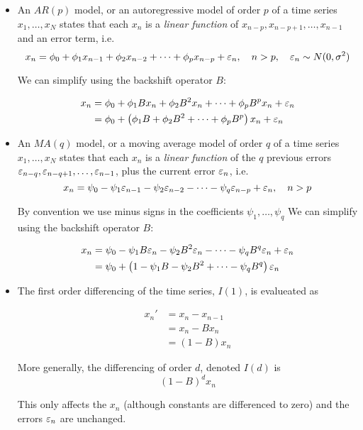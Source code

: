 \begin{itemize}
\item An $AR(p)$ model, or an autoregressive model of order $p$ of a time series $x_1,\dots,x_N$ states that each $x_n$ is a \textit{linear function} of $x_{n-p},x_{n-p+1},\dots,x_{n-1}$ and an error term, i.e. 
$$x_n= \phi_0+\phi_1 x_{n-1}+\phi_2 x_{n-2} +\dots + \phi_p x_{n-p}+\varepsilon_n,\quad n>p,\quad \varepsilon_n\sim N(0,\sigma^2)$$

We can simplify using the backshift operator $B$:

\begin{align}
x_n
&= \phi_0+\phi_1 Bx_n+\phi_2 B^2x_n +\dots + \phi_p B^px_n +\varepsilon_n\nonumber \\
&= \phi_0+\left(\phi_1 B+\phi_2 B^2 +\dots + \phi_p B^p\right)x_n +\varepsilon_n
\end{align}

\item An $MA(q)$ model, or a moving average model of order $q$ of a time series $x_1,\dots,x_N$ states that each $x_n$ is a \textit{linear function} of the $q$ previous errors $\varepsilon_{n-q},\varepsilon_{n-q+1},\dots,\varepsilon_{n-1}$, plus the current error $\varepsilon_n$, i.e. 
$$x_n= \psi_0-\psi_1 \varepsilon_{n-1}-\psi_2 \varepsilon_{n-2} -\dots - \psi_q \varepsilon_{n-p}+\varepsilon_n,\quad n>p$$

By convention we use minus signs in the coefficients $\psi_1,\dots,\psi_q$
We can simplify using the backshift operator $B$:

\begin{align}
x_n
&= \psi_0-\psi_1 B\varepsilon_n-\psi_2 B^2\varepsilon_n -\dots - \psi_q B^q\varepsilon_n + \varepsilon_n \nonumber \\
&= \psi_0+\left(1-\psi_1 B-\psi_2 B^2 +\dots - \psi_q B^q\right)\varepsilon_n 
\end{align}

\item The first order differencing of the time series, $I(1)$, is evalueated as 

\begin{align}
x_n'
&=x_n-x_{n-1}\nonumber \\
&=x_n-Bx_n \nonumber \\
&=\left(1-B\right)x_n
\end{align}

More generally, the differencing of order $d$, denoted $I(d)$ is 
$$(1-B)^d x_n$$

This only affects the $x_n$ (although constants are differenced to zero) and the errors $\varepsilon_n$ are unchanged.
\end{itemize}


